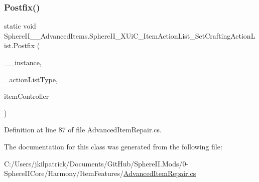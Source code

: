 \subsubsection{\texorpdfstring{Postfix()}{Postfix()}}
{\footnotesize\ttfamily static void Sphere\+I\+I\+\_\+\+\_\+\+Advanced\+Items.\+Sphere\+I\+I\+\_\+\+X\+Ui\+C\+\_\+\+Item\+Action\+List\+\_\+\+Set\+Crafting\+Action\+List.\+Postfix (\begin{DoxyParamCaption}\item[{X\+Ui\+C\+\_\+\+Item\+Action\+List}]{\+\_\+\+\_\+instance,  }\item[{X\+Ui\+C\+\_\+\+Item\+Action\+List.\+Item\+Action\+List\+Types}]{\+\_\+action\+List\+Type,  }\item[{X\+Ui\+Controller}]{item\+Controller }\end{DoxyParamCaption})\hspace{0.3cm}{\ttfamily [static]}}



Definition at line 87 of file Advanced\+Item\+Repair.\+cs.



The documentation for this class was generated from the following file\+:\begin{DoxyCompactItemize}
\item 
C\+:/\+Users/jkilpatrick/\+Documents/\+Git\+Hub/\+Sphere\+I\+I.\+Mods/0-\/\+Sphere\+I\+I\+Core/\+Harmony/\+Item\+Features/\mbox{\hyperlink{_advanced_item_repair_8cs}{Advanced\+Item\+Repair.\+cs}}\end{DoxyCompactItemize}
